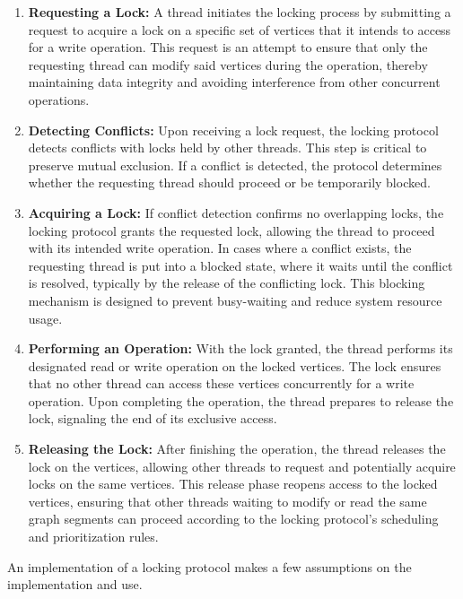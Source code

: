 \begin{enumerate}
    \item \textbf{Requesting a Lock:} A thread initiates the locking process by submitting a request to acquire a lock on a specific set of vertices that it intends to access for a write operation. This request is an attempt to ensure that only the requesting thread can modify said vertices during the operation, thereby maintaining data integrity and avoiding interference from other concurrent operations.

    \item \textbf{Detecting Conflicts:} Upon receiving a lock request, the locking protocol detects conflicts with locks held by other threads. This step is critical to preserve mutual exclusion. If a conflict is detected, the protocol determines whether the requesting thread should proceed or be temporarily blocked.


    \item \textbf{Acquiring a Lock:}  If conflict detection confirms no overlapping locks, the locking protocol grants the requested lock, allowing the thread to proceed with its intended write operation. In cases where a conflict exists, the requesting thread is put into a blocked state, where it waits until the conflict is resolved, typically by the release of the conflicting lock. This blocking mechanism is designed to prevent busy-waiting and reduce system resource usage.

    \item \textbf{Performing an Operation:} With the lock granted, the thread performs its designated read or write operation on the locked vertices. The lock ensures that no other thread can access these vertices concurrently for a write operation. Upon completing the operation, the thread prepares to release the lock, signaling the end of its exclusive access.
    
    \item \textbf{Releasing the Lock:} After finishing the operation, the thread releases the lock on the vertices, allowing other threads to request and potentially acquire locks on the same vertices. This release phase reopens access to the locked vertices, ensuring that other threads waiting to modify or read the same graph segments can proceed according to the locking protocol's scheduling and prioritization rules.
\end{enumerate}

An implementation of a locking protocol makes a few assumptions on the implementation and use.

